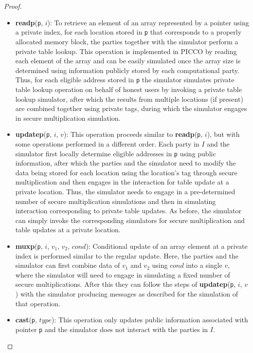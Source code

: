 \documentclass[11pt]{article}
\begin{document}
\begin{proof}
\begin{itemize}
  \item \textbf{readp}(\texttt{p}, $i$): To retrieve an element of an array
    represented by a pointer using a private index, for each location stored
    in \texttt{p} that corresponds to a properly allocated memory block, the
    parties together with the simulator perform a private table lookup. This
    operation is implemented in PICCO by reading each element of the array
    and can be easily simulated once the array size is determined using
    information publicly stored by each computational party. Thus, for each
    eligible address stored in \texttt{p} the simulator simulates private
    table lookup operation on behalf of honest users by invoking a private
    table lookup simulator, after which the results from multiple locations
    (if present) are combined together using private tags, during which the
    simulator engages in secure multiplication simulation.
    
  \item \textbf{updatep}(\texttt{p}, $i$, $v$): This operation proceeds
    similar to \textbf{readp}(\texttt{p}, $i$), but with some operations
    performed in a different order. Each party in $I$ and the simulator
    first locally determine eligible addresses in \texttt{p} using public
    information, after which the parties and the simulator need to modify
    the data being stored for each location using the location's tag through
    secure multiplication and then engages in the interaction for table
    update at a private location. Thus, the simulator needs to engage in a
    pre-determined number of secure multiplication simulations and then in
    simulating interaction corresponding to private table updates. As
    before, the simulator can simply invoke the corresponding simulators for
    secure multiplication and table updates at a private location.
    
  \item \textbf{muxp}(\texttt{p}, $i$, $v_1$, $v_2$, $cond$): Conditional
    update of an array element at a private index is performed similar to
    the regular update. Here, the parties and the simulator can first
    combine data of $v_1$ and $v_2$ using $cond$ into a single $v$, where
    the simulator will need to engage in simulating a fixed number of secure
    multiplications. After this they can follow the steps of
    \textbf{updatep}(\texttt{p}, $i$, $v$) with the simulator producing
    messages as described for the simulation of that operation.
    
  \item \textbf{cast}(\texttt{p}, $type$): This operation only updates
    public information associated with pointer \texttt{p} and the simulator
    does not interact with the parties in $I$.


\end{itemize}
\end{proof}
\end{document}
